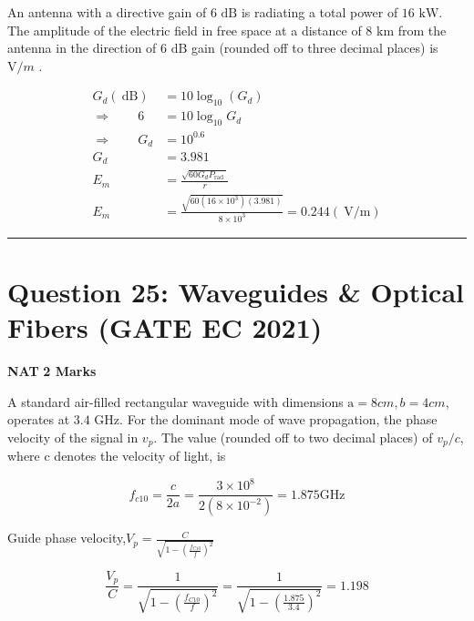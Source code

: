 \documentclass[11pt,a4paper]{article}
\begin{document}
\noindent An antenna with a directive gain of $6\text{ dB}$
is radiating a total power of $\text{16 kW}$. The amplitude of the electric field in free space at a distance of $\text{8 km}$
from the antenna in the direction of $\text{6 dB}$
gain (rounded off to three decimal places) is  \underline{\hspace{1.5cm}}  $\text{V} /m$
.


\begin{tcolorbox}[solbox, title=Detailed Solution -- Question 24]
\[
\begin{aligned} G_{d}(\mathrm{~dB}) &=10 \log _{10}\left(G_{d}\right) \\ \Rightarrow\qquad 6 &=10 \log _{10} G_{d} \\ \Rightarrow\qquad G_{d} &=10^{0.6} \\ G_{d} &=3.981 \\ E_{m} &=\frac{\sqrt{60 G_{d} P_{\text {rad }}}}{r} \\ E_{m} &=\frac{\sqrt{60\left(16 \times 10^{3}\right)(3.981)}}{8 \times 10^{3}}=0.244(\mathrm{~V} / \mathrm{m}) \end{aligned}
\]
\end{tcolorbox}

\vspace{1.5em}
\hrule
\vspace{1.5em}

\section*{Question 25: Waveguides \& Optical Fibers (GATE EC 2021)}
\noindent \textbf{\color{primary}NAT} \hfill \textbf{\color{secondary}2 Marks}


\noindent A standard air-filled rectangular waveguide with dimensions $\text{a} =8 cm, b=4 cm$, operates at $\text{3.4 GHz}$. For the dominant mode of wave propagation, the phase velocity of the signal in $v_{p}$. The value (rounded off to two decimal places) of $v_{p}/c$, where c denotes the velocity of light, is \underline{\hspace{1.5cm}}


\begin{tcolorbox}[solbox, title=Detailed Solution -- Question 25]
\[
f_{c 10}=\frac{c}{2 a}=\frac{3 \times 10^{8}}{2\left(8 \times 10^{-2}\right)}=1.875 \mathrm{GHz}
\]

 Guide phase velocity,$V_{p}=\frac{C}{\sqrt{1-\left(\frac{f_{C 10}}{f}\right)^{2}}}$

\[
\frac{V_{p}}{C}=\frac{1}{\sqrt{1-\left(\frac{f_{C 10}}{f}\right)^{2}}}=\frac{1}{\sqrt{1-\left(\frac{1.875}{3.4}\right)^{2}}}=1.198
\]
\end{tcolorbox}
\end{document}
